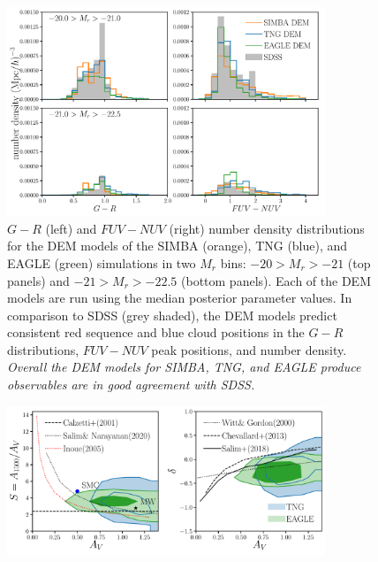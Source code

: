 \begin{figure}
\begin{center}
    \includegraphics[width=0.85\textwidth]{figs/abc_observables_mr_bin.pdf}
    \caption{\label{fig:demcloseup}
    $G-R$ (left) and $FUV-NUV$ (right) number density distributions for the DEM
    models of the SIMBA (orange), TNG (blue), and EAGLE (green) simulations in
    two $M_r$ bins: $-20 > M_r > -21$ (top panels) and $-21 > M_r > -22.5$
    (bottom panels).  Each of the DEM models are run using the median posterior
    parameter values. In comparison to SDSS (grey shaded), the DEM models predict 
    consistent red sequence and blue cloud positions in the $G-R$ distributions, 
    $FUV-NUV$ peak positions, and number density. {\em Overall the DEM
    models for SIMBA, TNG, and EAGLE produce observables are in good agreement 
    with SDSS.}
    }
\end{center}
\end{figure}


\begin{figure}
\begin{center}
    \includegraphics[width=0.85\textwidth]{figs/abc_slope_AV.pdf}
    \caption{\label{fig:slope}
    }
\end{center}
\end{figure}

